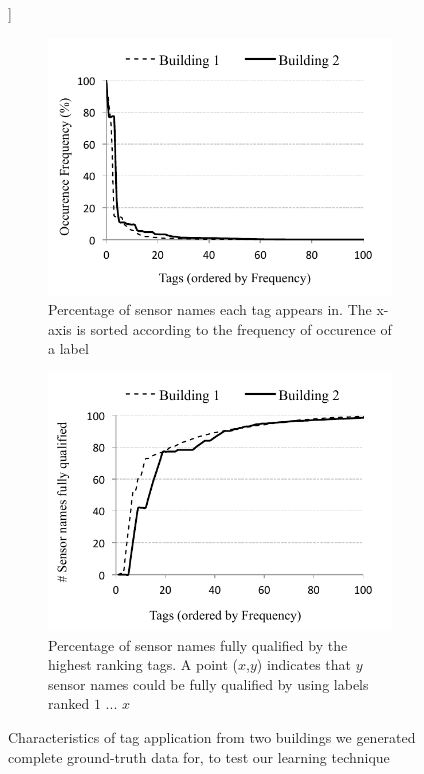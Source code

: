 \begin{figure}[h!]]
\centering
	\begin{subfigure}{0.48\textwidth}
                \centering
		\includegraphics[width=\textwidth]{./figs/pointOccuranceFreq.pdf}
                \caption{Percentage of sensor names each tag appears in. The x-axis is sorted according to the frequency of occurence of a label}
                \label{fig:labelFreq}
	\end{subfigure}
	\begin{subfigure}{0.48\textwidth}
                \centering
		\includegraphics[width=\textwidth]{./figs/pointCDF.pdf}
                \caption{Percentage of sensor names fully qualified by the highest ranking tags. A point ($x$,$y$) indicates that $y$ sensor names could be fully qualified by using labels ranked $1$ ... $x$}
                \label{fig:pointCDF}
	\end{subfigure}
\caption{Characteristics of tag application from two buildings we generated complete ground-truth data for, to test our learning technique}
\label{fig:buildingLabelCharacteristics}
\end{figure}


